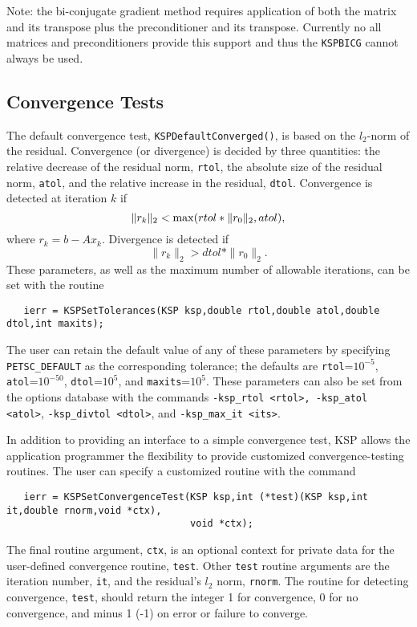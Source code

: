 Note: the bi-conjugate gradient method requires application of both the matrix and 
its transpose plus the preconditioner and its transpose. Currently no all matrices
and preconditioners provide this support and thus the {\tt KSPBICG} cannot always 
be used.  

\subsection{Convergence Tests}
\label{section:convergencetests}

The default convergence test, {\tt KSPDefaultConverged()}, is 
based on the $l_2$-norm of the residual. Convergence 
(or divergence) is decided by three quantities:
the relative decrease of the residual norm, {\tt rtol}, the absolute 
size of the residual norm, {\tt atol}, and the relative increase in the 
residual, {\tt dtol}.  Convergence is detected at iteration $ k $ if
\[  \| r_k \|_2 < {\rm max} ( rtol * \| r_0 \|_2, atol ), \]
where $r_k = b - A x_k$.  Divergence is detected if
\[  \| r_k \|_2 > dtol * \| r_0 \|_2. \]
These parameters, as well as the maximum number of allowable iterations, 
can be set with the routine 
\begin{verbatim}
   ierr = KSPSetTolerances(KSP ksp,double rtol,double atol,double dtol,int maxits);
\end{verbatim}
The user can retain the default value of any of these parameters by
specifying {\tt PETSC\_DEFAULT}  as the 
corresponding tolerance; the
defaults are {\tt rtol}=$10^{-5}$, {\tt atol}=$10^{-50}$,
{\tt dtol}=$10^{5}$, and {\tt maxits}=$10^5$.
These parameters can also be set from the options database with the 
commands {\tt -ksp\_rtol <rtol>, -ksp\_atol <atol>}, {\tt -ksp\_divtol <dtol>},
  
and {\tt -ksp\_max\_it <its>}. 

In addition to providing an interface to a simple convergence test,
KSP allows the application programmer the flexibility to provide 
customized convergence-testing routines.  
The user can specify a customized 
routine with the command 
\begin{verbatim}
   ierr = KSPSetConvergenceTest(KSP ksp,int (*test)(KSP ksp,int it,double rnorm,void *ctx),
                                void *ctx);
\end{verbatim}
The final routine argument, {\tt ctx}, is an optional context for private
data for the user-defined convergence routine, {\tt test}.  Other
{\tt test} routine arguments are the iteration
number, {\tt it}, and the residual's $ l_2 $ norm, {\tt rnorm}.
The routine for detecting convergence, {\tt test}, should return the 
integer 1 for convergence, 0 for no convergence, and minus 1 (-1) on error or 
failure to converge.  
 
